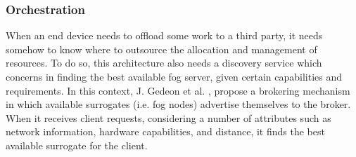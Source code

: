 \subsubsection{Orchestration}\label{sec:fog_arch_orchestration}
\noindent\tab When an end device needs to offload some work to a third party, it needs somehow to know where to outsource the allocation and management of resources. To do so, this architecture also needs a discovery service which concerns in finding the best available fog server, given certain capabilities and requirements. In this context, J. Gedeon et al. \cite{gedeon2017router}, propose a brokering mechanism in which available surrogates (i.e. fog nodes) advertise themselves to the broker. When it receives client requests, considering a number of attributes such as network information, hardware capabilities, and distance, it finds the best available surrogate for the client.\\
